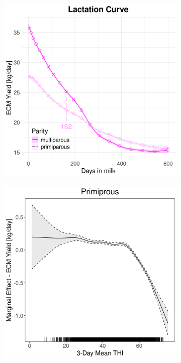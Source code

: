 \begin{figure}[H]
\begin{subfigure}[b]{0.45\textwidth}
        \includegraphics[width=\textwidth]{thesis/figures/models/ecm/before2010/sf_ecm_before2010/sf_ecm_before2010_marginal_dim_milk_combined.png}
    \end{subfigure}
    \begin{subfigure}[b]{0.45\textwidth}
        \centering
        \includegraphics[width=\textwidth]{thesis/figures/models/ecm/before2010/sf_ecm_before2010/sf_ecm_before2010_marginal_thi_milk_primi.png}

\end{subfigure}
\end{figure}
